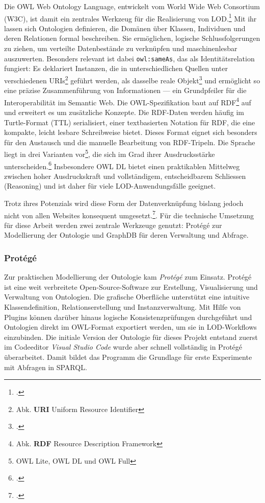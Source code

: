 \documentclass[12pt, a4paper, ngerman, bidi=default]{article}
\let\cite\footcite
\begin{document}
Die OWL Web Ontology Language, entwickelt vom World Wide Web Consortium (W3C), ist damit ein zentrales Werkzeug für die Realisierung von 
LOD.\cite[ vgl.][]{smith_owl_2004} 
Mit ihr lassen sich Ontologien definieren, die Domänen über Klassen, Individuen und deren Relationen formal beschreiben. 
Sie ermöglichen, logische Schlussfolgerungen zu ziehen, um verteilte Datenbestände zu verknüpfen und maschinenlesbar auszuwerten.
Besonders relevant ist dabei \texttt{owl:sameAs}, das als Identitätsrelation fungiert: 
Es deklariert Instanzen, die in unterschiedlichen Quellen unter verschiedenen URIs\footnote{Abk. \textbf{URI}\: Uniform Resource Identifier} geführt werden, 
als dasselbe reale Objekt\cite[ vgl.][2.3. Data Aggregation and Privacy]{smith_owl_2004}
und ermöglicht so eine präzise Zusammenführung von Informationen — ein Grundpfeiler für die Interoperabilität im Semantic Web.
Die OWL-Spezifikation baut auf RDF\footnote{Abk. \textbf{RDF}\; Resource Description Framework} auf und erweitert es um zusätzliche Konzepte.
Die RDF-Daten werden häufig im Turtle-Format (TTL) serialisiert, einer textbasierten Notation für RDF, die eine kompakte, leicht lesbare Schreibweise bietet.
Dieses Format eignet sich besonders für den Austausch und die manuelle Bearbeitung von RDF-Tripeln.
Die Sprache liegt in drei Varianten vor\footnote{OWL Lite, OWL DL und OWL Full}, die sich im Grad ihrer Ausdrucksstärke 
unterscheiden.\cite[ vgl.][1.1. The Species of OWL.]{smith_owl_2004}
Insbesondere OWL DL bietet einen praktikablen Mittelweg zwischen hoher Ausdruckskraft und vollständigem, entscheidbarem Schliessen (Reasoning) 
und ist daher für viele LOD-Anwendungsfälle geeignet.

Trotz ihres Potenzials wird diese Form der Datenverknüpfung bislang jedoch nicht von allen Websites konsequent 
umgesetzt.\cite[ vgl.][S. 14]{garoufallou_metadata_2020}. Für die technische 
Umsetzung für diese Arbeit werden zwei zentrale Werkzeuge genutzt: Protégé zur Modellierung der Ontologie und GraphDB für deren Verwaltung und Abfrage.

\subsubsection{Protégé} Zur praktischen Modellierung der Ontologie kam \textit{Protégé} zum Einsatz. 
Protégé ist eine weit verbreitete Open-Source-Software zur Erstellung, Visualisierung und Verwaltung von Ontologien.
Die grafische Oberfläche unterstützt eine intuitive Klassendefinition, 
Relationserstellung und Instanzverwaltung. 
Mit Hilfe von Plugins können darüber hinaus logische Konsistenzprüfungen durchgeführt und 
Ontologien direkt im OWL-Format exportiert werden, um sie in LOD-Workflows einzubinden.
Die initiale Version der Ontologie für dieses Projekt entstand zuerst im Codeeditor \textit{Visual Studio Code} wurde aber schnell vollständig in Protégé überarbeitet.
Damit bildet das Programm die Grundlage für erste Experimente mit Abfragen in SPARQL.%
\end{document}
